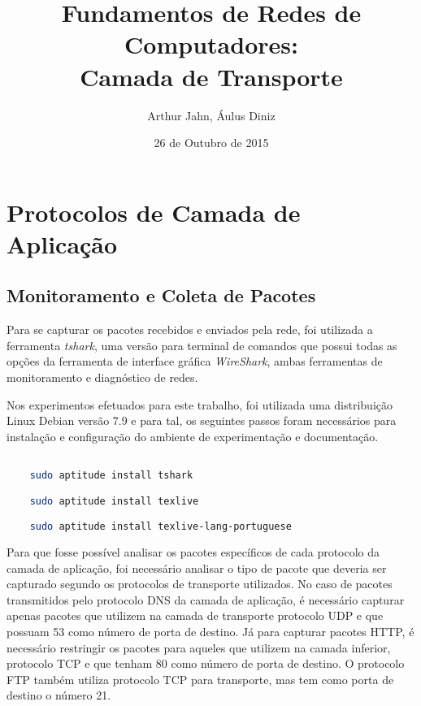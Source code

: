 \documentclass[a4paper]{report} %
\title{Fundamentos de Redes de Computadores: \\ Camada de Transporte}
\author{Arthur Jahn, Áulus Diniz}
\date{26 de Outubro de 2015}    %
\begin{document}
\maketitle  %

\tableofcontents %
\chapter{Protocolos de Camada de Aplicação}
\label{chap_primeiro} %

\section{Monitoramento e Coleta de Pacotes}
\label{sec_primeiro_monitoramento}

	Para	se capturar os pacotes recebidos e enviados pela rede, foi utilizada a ferramenta \textit{tshark}, uma versão para terminal de comandos que possui todas as opções da ferramenta de interface gráfica \textit{WireShark}, ambas ferramentas de monitoramento e diagnóstico de redes.

	Nos experimentos efetuados para este trabalho, foi utilizada uma distribuição Linux Debian versão 7.9 e para tal, os seguintes passos foram necessários para instalação e configuração do ambiente de experimentação e documentação.
\begin{lstlisting}[language=bash]

	sudo aptitude install tshark

	sudo aptitude install texlive

	sudo aptitude install texlive-lang-portuguese


\end{lstlisting}

	Para que fosse possível analisar os pacotes específicos de cada protocolo da camada de aplicação, foi necessário analisar o tipo de pacote que deveria ser capturado segundo os protocolos de transporte utilizados. No caso de pacotes transmitidos pelo protocolo DNS da camada de aplicação, é necessário capturar apenas pacotes que utilizem na camada de transporte protocolo UDP e que possuam 53 como número de porta de destino. Já para capturar pacotes HTTP, é necessário restringir os pacotes para aqueles que utilizem na camada inferior, protocolo TCP e que tenham 80 como número de porta de destino. O protocolo FTP
também utiliza protocolo TCP para transporte, mas tem como porta de destino o número 21.
\end{document}
